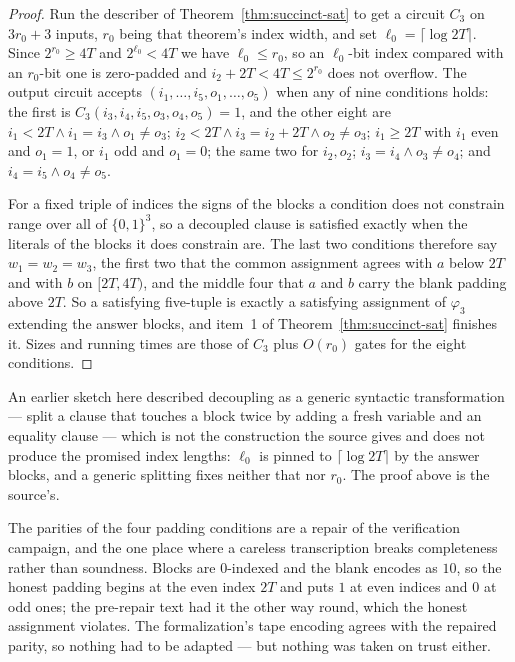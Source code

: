 \begin{proof}
\leanok

Run the describer of Theorem~\ref{thm:succinct-sat} to get a circuit $C_3$ on
$3 r_0 + 3$ inputs, $r_0$ being that theorem's index width, and set
$\ell_0 = \lceil \log 2T \rceil$. Since $2^{r_0} \geq 4T$ and $2^{\ell_0} < 4T$ we have
$\ell_0 \leq r_0$, so an $\ell_0$-bit index compared with an $r_0$-bit one is zero-padded
and $i_2 + 2T < 4T \leq 2^{r_0}$ does not overflow. The output circuit accepts
$(i_1, \ldots, i_5, o_1, \ldots, o_5)$ when any of nine conditions holds: the first is
$C_3(i_3, i_4, i_5, o_3, o_4, o_5) = 1$, and the other eight are
$i_1 < 2T \land i_1 = i_3 \land o_1 \neq o_3$; \;
$i_2 < 2T \land i_3 = i_2 + 2T \land o_2 \neq o_3$; \;
$i_1 \geq 2T$ with $i_1$ even and $o_1 = 1$, or $i_1$ odd and $o_1 = 0$; \; the same two for
$i_2, o_2$; \; $i_3 = i_4 \land o_3 \neq o_4$; and $i_4 = i_5 \land o_4 \neq o_5$.

For a fixed triple of indices the signs of the blocks a condition does not constrain range
over all of $\{0,1\}^3$, so a decoupled clause is satisfied exactly when the literals of the
blocks it does constrain are. The last two conditions therefore say $w_1 = w_2 = w_3$, the
first two that the common assignment agrees with $a$ below $2T$ and with $b$ on $[2T, 4T)$,
and the middle four that $a$ and $b$ carry the blank padding above $2T$. So a satisfying
five-tuple is exactly a satisfying assignment of $\varphi_{3}$ extending the answer blocks,
and item~1 of Theorem~\ref{thm:succinct-sat} finishes it. Sizes and running times are those
of $C_3$ plus $O(r_0)$ gates for the eight conditions.
\end{proof}

\begin{remark}
\label{rem:decoupled-5sat-repairs}
An earlier sketch here described decoupling as a generic syntactic transformation --- split a
clause that touches a block twice by adding a fresh variable and an equality clause --- which
is not the construction the source gives and does not produce the promised index lengths:
$\ell_0$ is pinned to $\lceil \log 2T \rceil$ by the answer blocks, and a generic splitting
fixes neither that nor $r_0$. The proof above is the source's.

The parities of the four padding conditions are a repair of the verification campaign, and
the one place where a careless transcription breaks completeness rather than soundness.
Blocks are $0$-indexed and the blank encodes as $10$, so the honest padding begins at the
even index $2T$ and puts $1$ at even indices and $0$ at odd ones; the pre-repair text had it
the other way round, which the honest assignment violates. The formalization's tape encoding
agrees with the repaired parity, so nothing had to be adapted --- but nothing was taken on
trust either.
\end{remark}

